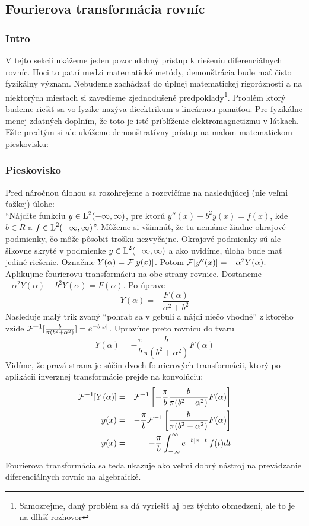 \subsection{Fourierova transformácia rovníc}

\subsubsection{Intro}


V tejto sekcii ukážeme jeden pozorudohný prístup k riešeniu
diferenciálnych rovníc. Hoci to patrí medzi matematické
metódy, demonštrácia bude mať čisto fyzikálny význam. Nebudeme
zachádzať do úplnej matematickej rigoróznosti a na niektorých miestach
si zavedieme zjednodušené predpoklady\footnote{Samozrejme, daný
problém sa dá vyriešiť aj bez týchto obmedzení, ale to je na dlhší
rozhovor}. Problém ktorý budeme riešiť sa vo fyzike nazýva dieektrikum
s lineárnou pamäťou. Pre fyzikálne menej zdatných doplním, že toto je
isté priblíženie elektromagnetizmu v látkach. Ešte predtým si ale
ukážeme demonštratívny prístup na malom matematickom pieskovisku:

\subsubsection{Pieskovisko}

Pred náročnou úlohou sa rozohrejeme a rozcvičíme na nasledujúcej (nie
veľmi ťažkej) úlohe: \\
``Nájdite funkciu $y \in \mbox{L}^2(-\infty,\infty)$, pre ktorú
$y''(x) - b^2 y(x) = f(x)$, kde $b\in R$ a $f \in \mbox{L}^2(-\infty,\infty)$''.
Môžeme si všimnúť, že tu nemáme žiadne okrajové podmienky, čo môže
pôsobiť trošku nezvyčajne. Okrajové podmienky sú ale šikovne skryté v
podmienke $y \in \mbox{L}^2(-\infty,\infty)$ a ako uvidíme, úloha bude mať jediné
riešenie.
Označme $Y(\alpha)=\mathcal{F}[y(x)]$. Potom $\mathcal{F}[y''(x)] =
-\alpha^2 Y(\alpha)$.
Aplikujme fourierovu transformáciu na obe strany rovnice.
Dostaneme $-\alpha^2 Y(\alpha) - b^2 Y(\alpha) = F(\alpha)$.
Po úprave 
\begin{equation}
    Y(\alpha)= -\frac{F(\alpha)}{\alpha^2 + b^2}
\end{equation}
Nasleduje malý trik zvaný ``pohrab sa v gebuli a nájdi niečo vhodné''
z ktorého vzíde
$\mathcal{F}^{-1}[\frac{b}{\pi(b^2+\alpha^2)}]=e^{-b|x|}$.
Upravíme preto rovnicu do tvaru
\begin{equation}
    Y(\alpha) = -\frac{\pi}{b} \frac{b}{\pi(b^2 + \alpha^2)}
    F(\alpha)
\end{equation}
Vidíme, že pravá strana je súčin dvoch fourierových transformácii,
ktorý po aplikácii inverznej transformácie prejde na konvolúciu:
\begin{eqnarray*}
    \mathcal{F}^{-1}[Y(\alpha)] &=& \mathcal{F}^{-1}\left[
            -\frac{\pi}{b} \frac{b}{\pi(b^2 + \alpha^2)}
            F(\alpha)\right] \\
    y(x) &=&  -\frac{\pi}{b} \mathcal{F}^{-1}\left[\frac{b}{\pi(b^2 +
    \alpha^2)} F(\alpha)\right] \\
    y(x) &=& -\frac{\pi}{b} \int_{-\infty}^{\infty} e^{-b |x-t|} f(t) dt
\end{eqnarray*}
Fourierova transformácia sa teda ukazuje ako veľmi dobrý nástroj na
prevádzanie diferenciálnych rovníc na algebraické.

